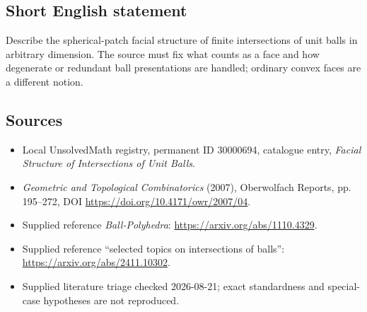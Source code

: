 \documentclass[11pt]{article}
\begin{document}
\subsection{Short English statement}
Describe the spherical-patch facial structure of finite intersections of unit balls in arbitrary dimension. The source must fix what counts as a face and how degenerate or redundant ball presentations are handled; ordinary convex faces are a different notion.
\subsection{Sources}
\begin{itemize}
\item Local UnsolvedMath registry, permanent ID 30000694, catalogue entry, \emph{Facial Structure of Intersections of Unit Balls}.
\item \emph{Geometric and Topological Combinatorics} (2007), Oberwolfach Reports, pp. 195--272, DOI \url{https://doi.org/10.4171/owr/2007/04}.
\item Supplied reference \emph{Ball-Polyhedra}: \url{https://arxiv.org/abs/1110.4329}.
\item Supplied reference ``selected topics on intersections of balls'': \url{https://arxiv.org/abs/2411.10302}.
\item Supplied literature triage checked 2026-08-21; exact standardness and special-case hypotheses are not reproduced.
\end{itemize}
\end{document}
